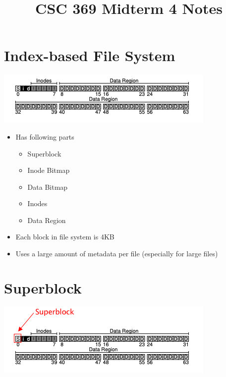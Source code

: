 \documentclass[12pt]{article}
\begin{document}
\title{CSC 369 Midterm 4 Notes}



\section*{Index-based File System}

\begin{center}

\includegraphics[width=\linewidth]{../images/midterm_2_solution_20.png}
\end{center}

\begin{itemize}
    \item Has following parts

    \begin{itemize}
        \item Superblock
        \item Inode Bitmap
        \item Data Bitmap
        \item Inodes
        \item Data Region
    \end{itemize}

    \item Each block in file system is 4KB
    \item Uses a large amount of metadata per file (especially for large files)
\end{itemize}

\section*{Superblock}

\begin{center}
\includegraphics[width=\linewidth]{../images/midterm_2_solution_21.png}
\end{center}
\end{document}
